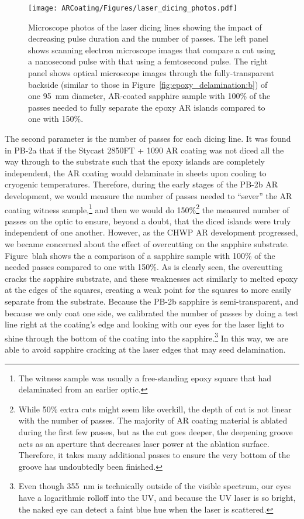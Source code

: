 \begin{figure}[!t]
    \centering
    \texttt{[image: ARCoating/Figures/laser\_dicing\_photos.pdf]}
    \caption[Microscope photos of the laser dicing lines showing the impact of decreasing pulse duration and the number of passes.]{Microscope photos of the laser dicing lines showing the impact of decreasing pulse duration and the number of passes. The left panel shows scanning electron microscope images that compare a cut using a nanosecond pulse with that using a femtosecond pulse. The right panel shows optical microscope images through the fully-transparent backside (similar to those in Figure~\ref{fig:epoxy_delamination:b}) of one 95~mm diameter, AR-coated sapphire sample with 100\% of the passes needed to fully separate the epoxy AR islands compared to one with 150\%.}
    \label{fig:sapphire_ar_laser_dicing}
\end{figure}

The second parameter is the number of passes for each dicing line. It was found in PB-2a that if the Stycast 2850FT + 1090 AR coating was not diced all the way through to the substrate such that the epoxy islands are completely independent, the AR coating would delaminate in sheets upon cooling to cryogenic temperatures. Therefore, during the early stages of the PB-2b AR development, we would measure the number of passes needed to ``sever'' the AR coating witness sample,\footnote{The witness sample was usually a free-standing epoxy square that had delaminated from an earlier optic.} and then we would do 150\%\footnote{While 50\% extra cuts might seem like overkill, the depth of cut is not linear with the number of passes. The majority of AR coating material is ablated during the first few passes, but as the cut goes deeper, the deepening groove acts as an aperture that decreases laser power at the ablation surface. Therefore, it takes many additional passes to ensure the very bottom of the groove has undoubtedly been finished.} the measured number of passes on the optic to ensure, beyond a doubt, that the diced islands were truly independent of one another. However, as the CHWP AR development progressed, we became concerned about the effect of overcutting on the sapphire substrate. Figure~blah shows the a comparison of a sapphire sample with 100\% of the needed passes compared to one with 150\%. As is clearly seen, the overcutting cracks the sapphire substrate, and these weaknesses act similarly to melted epoxy at the edges of the squares, creating a weak point for the squares to more easily separate from the substrate. Because the PB-2b sapphire is semi-transparent, and because we only coat one side, we calibrated the number of passes by doing a test line right at the coating's edge and looking with our eyes for the laser light to shine through the bottom of the coating into the sapphire.\footnote{Even though 355~nm is technically outside of the visible spectrum, our eyes have a logarithmic rolloff into the UV, and because the UV laser is so bright, the naked eye can detect a faint blue hue when the laser is scattered.} In this way, we are able to avoid sapphire cracking at the laser edges that may seed delamination.

